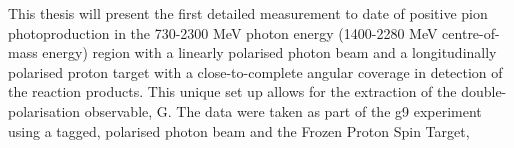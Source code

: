 This thesis will present the first detailed measurement to date of positive pion photoproduction in the 730-2300 MeV photon energy (1400-2280 MeV centre-of-mass energy) region with a linearly polarised photon beam and a longitudinally polarised proton target with a close-to-complete angular coverage in detection of the reaction products. This unique set up allows for the extraction of
the double-polarisation observable, G. The data were taken as part of the g9 experiment using a tagged, polarised photon beam and the Frozen Proton Spin Target,

